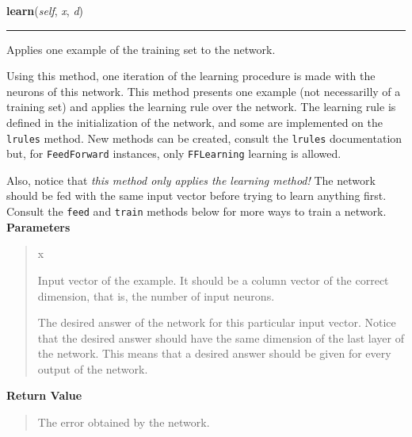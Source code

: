     \label{peach:nn:nnet:FeedForward:learn}

    \vspace{0.5ex}

\hspace{.8\funcindent}\begin{boxedminipage}{\funcwidth}

    \raggedright \textbf{learn}(\textit{self}, \textit{x}, \textit{d})

    \vspace{-1.5ex}

    \rule{\textwidth}{0.5\fboxrule}
\setlength{\parskip}{2ex}

Applies one example of the training set to the network.

Using this method, one iteration of the learning procedure is made with
the neurons of this network. This method presents one example (not
necessarilly of a training set) and applies the learning rule over the
network. The learning rule is defined in the initialization of the
network, and some are implemented on the \texttt{lrules} method. New methods
can be created, consult the \texttt{lrules} documentation but, for
\texttt{FeedForward} instances, only \texttt{FFLearning} learning is allowed.

Also, notice that \emph{this method only applies the learning method!} The
network should be fed with the same input vector before trying to learn
anything first. Consult the \texttt{feed} and \texttt{train} methods below for
more ways to train a network.
\setlength{\parskip}{1ex}
      \textbf{Parameters}
      \vspace{-1ex}

      \begin{quote}
        \begin{Ventry}{x}

          \item[x]


Input vector of the example. It should be a column vector of the
correct dimension, that is, the number of input neurons.
          \item[d]


The desired answer of the network for this particular input vector.
Notice that the desired answer should have the same dimension of the
last layer of the network. This means that a desired answer should
be given for every output of the network.
        \end{Ventry}

      \end{quote}

      \textbf{Return Value}
    \vspace{-1ex}

      \begin{quote}

The error obtained by the network.
      \end{quote}

    \end{boxedminipage}

